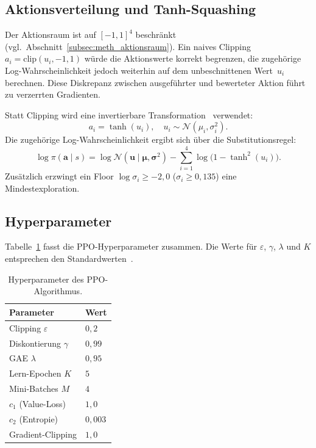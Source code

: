 \subsection{Aktionsverteilung und Tanh-Squashing}
\label{subsec:meth_tanh_squashing}

Der Aktionsraum ist auf $[-1,1]^4$
beschränkt (vgl.\ Abschnitt~\ref{subsec:meth_aktionsraum}). Ein naives
Clipping $a_i = \mathrm{clip}(u_i, -1, 1)$ würde die Aktionswerte korrekt
begrenzen, die zugehörige Log-Wahrscheinlichkeit jedoch weiterhin auf dem
unbeschnittenen Wert~$u_i$ berechnen. Diese Diskrepanz
zwischen ausgeführter und bewerteter Aktion führt zu verzerrten Gradienten.

Statt
Clipping wird eine invertierbare
Transformation~\autocite{haarnojaSoftActorCriticOffPolicy2018} verwendet:
\begin{equation} \label{eq:meth_tanh_squashing}
  a_i = \tanh(u_i), \quad u_i \sim \mathcal{N}(\mu_i, \sigma_i^2).
\end{equation}
Die zugehörige Log-Wahrscheinlichkeit ergibt sich über die
Substitutionsregel:
\begin{equation} \label{eq:meth_tanh_logprob}
  \log\pi(\mathbf{a} \mid s)
  = \log\mathcal{N}(\mathbf{u} \mid \boldsymbol{\mu}, \boldsymbol{\sigma}^2)
  - \sum_{i=1}^{4} \log\!\bigl(1 - \tanh^2(u_i)\bigr).
\end{equation}
Zusätzlich erzwingt ein Floor $\log\sigma_i \geq -2{,}0$
($\sigma_i \geq 0{,}135$) eine Mindestexploration.

\subsection{Hyperparameter}
\label{subsec:meth_hyperparams}

Tabelle~\ref{tab:meth_ppo_hyperparams} fasst die PPO-Hyperparameter zusammen.
Die Werte für $\varepsilon$, $\gamma$, $\lambda$ und $K$ entsprechen den
Standardwerten~\autocite{schulmanProximalPolicyOptimization2017,
schulmanHighDimensionalContinuousControl2016}.

\begin{table}[ht]
\centering
\caption{Hyperparameter des PPO-Algorithmus.}
\label{tab:meth_ppo_hyperparams}
\small
\begin{tabular}{l l}
\toprule
\textbf{Parameter} & \textbf{Wert} \\
\midrule
Clipping $\varepsilon$      & $0{,}2$ \\
Diskontierung $\gamma$      & $0{,}99$ \\
GAE $\lambda$               & $0{,}95$ \\
Lern-Epochen $K$            & $5$ \\
Mini-Batches $M$            & $4$ \\
$c_1$ (Value-Loss)          & $1{,}0$ \\
$c_2$ (Entropie)            & $0{,}003$ \\
Gradient-Clipping           & $1{,}0$ \\
\bottomrule
\end{tabular}
\end{table}

